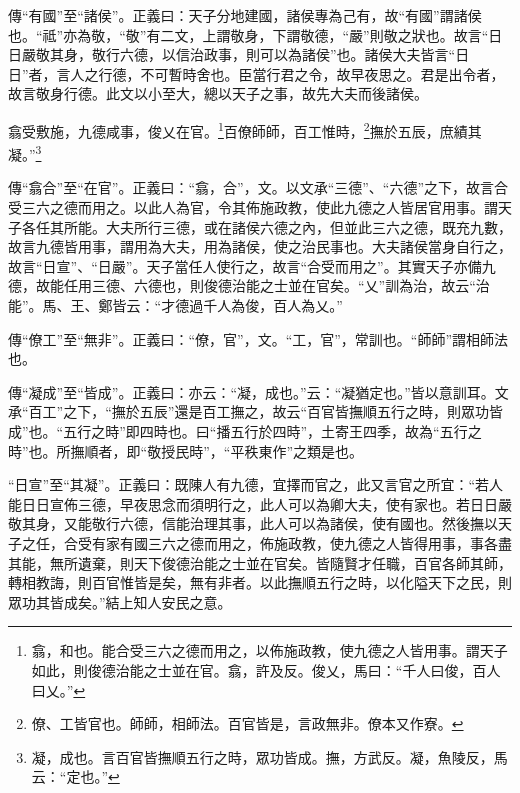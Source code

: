 {\noindent\zhuan{}\fzbyks 傳“有國”至“諸侯”。正義曰：天子分地建國，諸侯專為己有，故“有國”謂諸侯也。“祗”亦為敬，“敬”有二文，上謂敬身，下謂敬德，“嚴”則敬之狀也。故言“日日嚴敬其身，敬行六德，以信治政事，則可以為諸侯”也。諸侯大夫皆言“日日”者，言人之行德，不可暫時舍也。臣當行君之令，故早夜思之。君是出令者，故言敬身行德。此文以小至大，總以天子之事，故先大夫而後諸侯。 \par}

翕受敷施，九德咸事，俊乂在官。\footnote{翕，和也。能合受三六之德而用之，以佈施政教，使九德之人皆用事。謂天子如此，則俊德治能之士並在官。翕，許及反。俊乂，馬曰：“千人曰俊，百人曰乂。”}百僚師師，百工惟時，\footnote{僚、工皆官也。師師，相師法。百官皆是，言政無非。僚本又作寮。}撫於五辰，庶績其凝。”\footnote{凝，成也。言百官皆撫順五行之時，眾功皆成。撫，方武反。凝，魚陵反，馬云：“定也。”}

{\noindent\zhuan{}\fzbyks 傳“翕合”至“在官”。正義曰：“翕，合”，文。以文承“三德”、“六德”之下，故言合受三六之德而用之。以此人為官，令其佈施政教，使此九德之人皆居官用事。謂天子各任其所能。大夫所行三德，或在諸侯六德之內，但並此三六之德，既充九數，故言九德皆用事，謂用為大夫，用為諸侯，使之治民事也。大夫諸侯當身自行之，故言“日宣”、“日嚴”。天子當任人使行之，故言“合受而用之”。其實天子亦備九德，故能任用三德、六德也，則俊德治能之士並在官矣。“乂”訓為治，故云“治能”。馬、王、鄭皆云：“才德過千人為俊，百人為乂。” \par}

{\noindent\zhuan{}\fzbyks 傳“僚工”至“無非”。正義曰：“僚，官”，文。“工，官”，常訓也。“師師”謂相師法也。 \par}

{\noindent\zhuan{}\fzbyks 傳“凝成”至“皆成”。正義曰：亦云：“凝，成也。”云：“凝猶定也。”皆以意訓耳。文承“百工”之下，“撫於五辰”還是百工撫之，故云“百官皆撫順五行之時，則眾功皆成”也。“五行之時”即四時也。曰“播五行於四時”，土寄王四季，故為“五行之時”也。所撫順者，即“敬授民時”，“平秩東作”之類是也。 \par}

{\noindent\shu{}\fzkt “日宣”至“其凝”。正義曰：既陳人有九德，宜擇而官之，此又言官之所宜：“若人能日日宣佈三德，早夜思念而須明行之，此人可以為卿大夫，使有家也。若日日嚴敬其身，又能敬行六德，信能治理其事，此人可以為諸侯，使有國也。然後撫以天子之任，合受有家有國三六之德而用之，佈施政教，使九德之人皆得用事，事各盡其能，無所遺棄，則天下俊德治能之士並在官矣。皆隨賢才任職，百官各師其師，轉相教誨，則百官惟皆是矣，無有非者。以此撫順五行之時，以化隘天下之民，則眾功其皆成矣。”結上知人安民之意。 \par}

